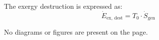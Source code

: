 The exergy destruction is expressed as:  
\[
\dot{E}_{\text{ex, dest}} = T_0 \cdot \dot{S}_{\text{gen}}
\]  

No diagrams or figures are present on the page.